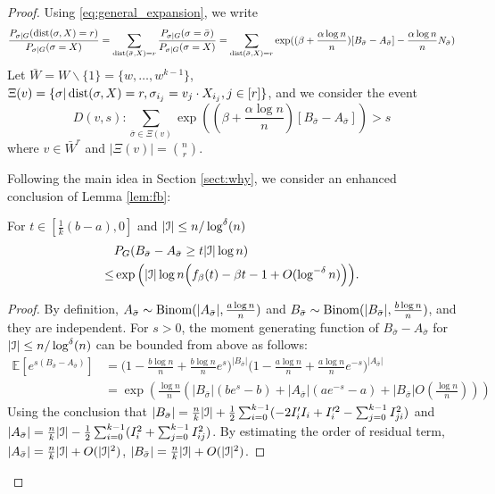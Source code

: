 \documentclass{article}
\begin{document}
\begin{proof}
Using \eqref{eq:general_expansion}, we write
$$
\frac{P_{\sigma|G}(\operatorname{dist}(\sigma, X)=r)}
{P_{\sigma|G}(\sigma=X)} = \sum_{\operatorname{dist}(\bar{\sigma}, X)=r} 
\frac{P_{\sigma|G}(\sigma=\bar{\sigma})}
{P_{\sigma|G}(\sigma=X)}=
\sum_{\operatorname{dist}(\bar{\sigma}, X)=r} \exp((\beta + \frac{\alpha \log n}{n})[B_{\bar{\sigma}} - A_{\bar{\sigma}}] - \frac{\alpha \log n}{n} N_{\bar{\sigma}})
$$
Let $\bar{W} = W\backslash\{1\} = \{w, \dots, w^{k-1}\}$, $\Xi(v) = \{ \sigma | \operatorname{dist}(\sigma, X) = r,  \sigma_{i_j} = v_j \cdot X_{i_j}, j \in [r] \}$,
and we consider the event
$$
D(v, s): \sum_{\bar{\sigma} \in \Xi(v)} \exp((\beta + \frac{\alpha \log n}{n}) [B_{\bar{\sigma}} - A_{\bar{\sigma}}]) > s
$$
where $v \in \bar{W}^r$ and $|\Xi(v)|=\binom{n}{r}$.

Following the main idea in Section \ref{sect:why}, we consider an enhanced conclusion of Lemma \ref{lem:fb}:
\begin{lemma}\label{lem:enhanced_fb}
	For $t\in [\frac{1}{k}(b-a), 0]$
	and $ |\mathcal{I}| \le n/\log^{\delta}(n)$
	\begin{equation} \label{eq:upmpt}
	\begin{aligned}
	& P_G(B_{\bar{\sigma}}-A_{\bar{\sigma}}\ge t |\mathcal{I}| \log n)  \\
	\le & \exp\Big(|\mathcal{I}| \log n
	\Big(f_{\beta}(t) - \beta t -1	+ O(\log^{-\delta} n) \Big)\Big) .
	\end{aligned}
	\end{equation}
\end{lemma}
\begin{proof}
	By definition, $A_{\bar{\sigma}}\sim\operatorname{Binom}(|A_{\bar{\sigma}}|,\frac{a\log n}{n})$ and
	$B_{\bar{\sigma}}\sim\operatorname{Binom}(|B_{\bar{\sigma}}|,\frac{b\log n}{n})$, and they are independent. For $s>0$, the moment generating function of $B_{\bar{\sigma}}-A_{\bar{\sigma}}$ for $ |\mathcal{I}| \le n/\log^{\delta}(n)$ can be bounded from above as follows:
	\begin{align*}
	 \mathbb{E}[e^{s(B_{\bar{\sigma}}-A_{\bar{\sigma}})}] 
	& =\Big(1-\frac{b\log n}{n}+\frac{b\log n}{n} e^s \Big)^{|B_{\bar{\sigma}}|}
	\Big(1-\frac{a\log n}{n}+\frac{a\log n}{n} e^{-s} \Big)^{|A_{\bar{\sigma}}|}  \\
	& = \exp(\frac{\log n}{n}\left(|B_{\bar{\sigma}}|(be^s - b) + |A_{\bar{\sigma}}|(ae^{-s}-a) + |B_{\bar{\sigma}}|O(\frac{\log n}{n}) \right))
	\end{align*}
	Using the conclusion that $|B_{\bar{\sigma}}|=\frac{n}{k}|\mathcal{I}| + \frac{1}{2}\sum_{i=0}^{k-1}  (-2 I'_i I_i  + I'^2_i - \sum_{j=0}^{k-1} I^2_{ji})$ and
	$|A_{\bar{\sigma}}| = \frac{n}{k}|\mathcal{I}| - \frac{1}{2}\sum_{i=0}^{k-1}  (I^2_i + \sum_{j=0}^{k-1} I^2_{ij})$.
	By estimating the order of residual term, $|A_{\bar{\sigma}}| = \frac{n}{k}|\mathcal{I}| + O(|\mathcal{I}|^2)$,
	 $|B_{\bar{\sigma}}| = \frac{n}{k}|\mathcal{I}| + O(|\mathcal{I}|^2)$.
	 

\end{proof}
\end{proof}
\end{document}
